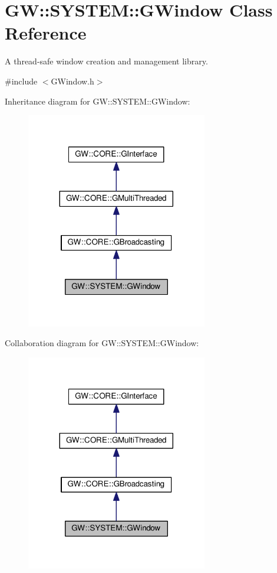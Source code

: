 \hypertarget{classGW_1_1SYSTEM_1_1GWindow}{}\section{GW\+:\+:S\+Y\+S\+T\+EM\+:\+:G\+Window Class Reference}
\label{classGW_1_1SYSTEM_1_1GWindow}


A thread-\/safe window creation and management library.  




{\ttfamily \#include $<$G\+Window.\+h$>$}



Inheritance diagram for GW\+:\+:S\+Y\+S\+T\+EM\+:\+:G\+Window\+:
\nopagebreak
\begin{figure}[H]
\begin{center}
\leavevmode
\includegraphics[width=224pt]{classGW_1_1SYSTEM_1_1GWindow__inherit__graph}
\end{center}
\end{figure}


Collaboration diagram for GW\+:\+:S\+Y\+S\+T\+EM\+:\+:G\+Window\+:
\nopagebreak
\begin{figure}[H]
\begin{center}
\leavevmode
\includegraphics[width=224pt]{classGW_1_1SYSTEM_1_1GWindow__coll__graph}
\end{center}
\end{figure}
